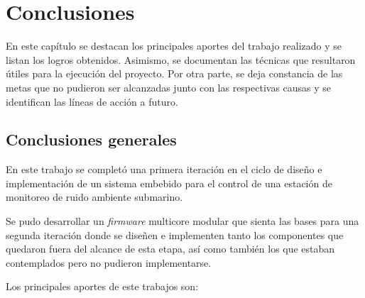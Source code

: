 
\chapter{Conclusiones} %

\label{Chapter5} %

En este capítulo se destacan los principales aportes del trabajo realizado y se listan los logros obtenidos.  Asimismo, se documentan las técnicas que resultaron  útiles para la ejecución del proyecto.  Por otra parte, se deja constancia de las metas que no pudieron ser alcanzadas junto con las respectivas causas y se identifican las líneas de acción a futuro.


\section{Conclusiones generales }


En este trabajo se completó una primera iteración en el ciclo de diseño e implementación de un sistema embebido para el control de una estación de monitoreo de ruido ambiente submarino.  

Se pudo desarrollar un \textit{firmware} multicore modular que sienta las bases para una segunda iteración donde se diseñen e implementen tanto los componentes que quedaron fuera del alcance de esta etapa, así como también los que estaban contemplados pero no pudieron implementarse.

Los principales aportes de este trabajos son:

